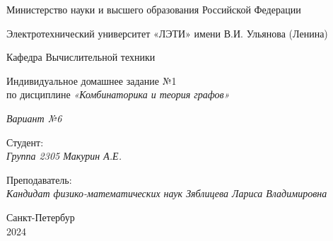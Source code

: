 \thispagestyle{empty}

\begin{center}
    Министерство науки и высшего образования Российской Федерации

    \vspace{20pt}

    Электротехнический университет «ЛЭТИ» имени В.И. Ульянова (Ленина)

    \vspace{20pt}

    Кафедра Вычислительной техники
\end{center}

\vfill

\begin{center}
    Индивидуальное домашнее задание №1\\
    по дисциплине \textit{«Комбинаторика и теория графов»}

    \vspace{20pt}

    \textit{Вариант №6}

\end{center}

\vfill

\noindent Студент: \\
\textit{Группа 2305 \hfill Макурин А.Е.}

\vspace{20pt}

\noindent Преподаватель: \\
\textit{Кандидат физико-математических наук \hfill Зяблицева Лариса Владимировна}

\vfill

\begin{center}
    Санкт-Петербур \\2024
\end{center}